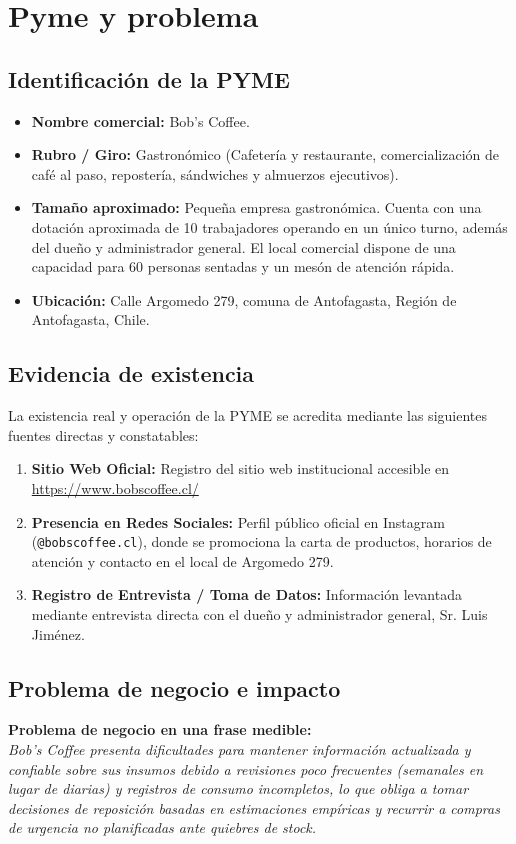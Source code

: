\documentclass[11pt,letterpaper]{article}
\begin{document}
\newpage

\section{Pyme y problema}

\subsection{Identificación de la PYME}
\begin{itemize}
    \item \textbf{Nombre comercial:} Bob's Coffee.
    \item \textbf{Rubro / Giro:} Gastronómico (Cafetería y restaurante, comercialización de café al paso, repostería, sándwiches y almuerzos ejecutivos).
    \item \textbf{Tamaño aproximado:} Pequeña empresa gastronómica. Cuenta con una dotación aproximada de 10 trabajadores operando en un único turno, además del dueño y administrador general. El local comercial dispone de una capacidad para 60 personas sentadas y un mesón de atención rápida.
    \item \textbf{Ubicación:} Calle Argomedo 279, comuna de Antofagasta, Región de Antofagasta, Chile.
\end{itemize}

\subsection{Evidencia de existencia}
La existencia real y operación de la PYME se acredita mediante las siguientes fuentes directas y constatables:
\begin{enumerate}
    \item \textbf{Sitio Web Oficial:} Registro del sitio web institucional accesible en \url{https://www.bobscoffee.cl/}
    \item \textbf{Presencia en Redes Sociales:} Perfil público oficial en Instagram (\texttt{@bobscoffee.cl}), donde se promociona la carta de productos, horarios de atención y contacto en el local de Argomedo 279.
    \item \textbf{Registro de Entrevista / Toma de Datos:} Información levantada mediante entrevista directa con el dueño y administrador general, Sr. Luis Jiménez.
\end{enumerate}

\subsection{Problema de negocio e impacto}
\textbf{Problema de negocio en una frase medible:} \\
\textit{Bob's Coffee presenta dificultades para mantener información actualizada y confiable sobre sus insumos debido a revisiones poco frecuentes (semanales en lugar de diarias) y registros de consumo incompletos, lo que obliga a tomar decisiones de reposición basadas en estimaciones empíricas y recurrir a compras de urgencia no planificadas ante quiebres de stock.}
\end{document}
